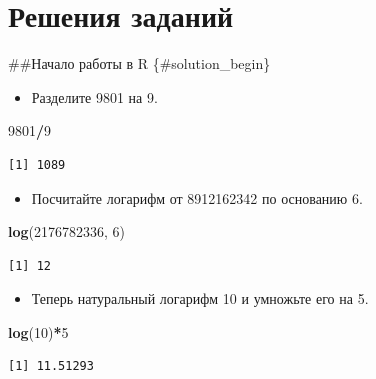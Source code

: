 \documentclass[
]{book}
\newenvironment{Shaded}{\begin{snugshade}}{\end{snugshade}}
\newcommand{\DecValTok}[1]{\textcolor[rgb]{0.00,0.00,0.81}{#1}}
\newcommand{\KeywordTok}[1]{\textcolor[rgb]{0.13,0.29,0.53}{\textbf{#1}}}
\newcommand{\NormalTok}[1]{#1}
\newcommand{\OperatorTok}[1]{\textcolor[rgb]{0.81,0.36,0.00}{\textbf{#1}}}
\providecommand{\tightlist}{%
  \setlength{\itemsep}{0pt}\setlength{\parskip}{0pt}}
\begin{document}
\hypertarget{solutions}{%
\chapter{Решения заданий}\label{solutions}}

\#\#Начало работы в R \{\#solution\_begin\}

\begin{itemize}
\tightlist
\item
  Разделите 9801 на 9.
\end{itemize}

\begin{Shaded}
\begin{Highlighting}[]
\DecValTok{9801}\OperatorTok{/}\DecValTok{9}
\end{Highlighting}
\end{Shaded}

\begin{verbatim}
[1] 1089
\end{verbatim}

\begin{itemize}
\tightlist
\item
  Посчитайте логарифм от 8912162342 по основанию 6.
\end{itemize}

\begin{Shaded}
\begin{Highlighting}[]
\KeywordTok{log}\NormalTok{(}\DecValTok{2176782336}\NormalTok{, }\DecValTok{6}\NormalTok{)}
\end{Highlighting}
\end{Shaded}

\begin{verbatim}
[1] 12
\end{verbatim}

\begin{itemize}
\tightlist
\item
  Теперь натуральный логарифм 10 и умножьте его на 5.
\end{itemize}

\begin{Shaded}
\begin{Highlighting}[]
\KeywordTok{log}\NormalTok{(}\DecValTok{10}\NormalTok{)}\OperatorTok{*}\DecValTok{5}
\end{Highlighting}
\end{Shaded}

\begin{verbatim}
[1] 11.51293
\end{verbatim}
\end{document}
